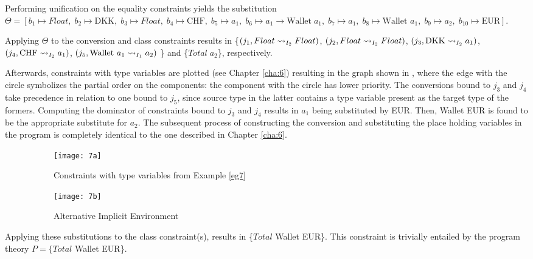Performing unification on the equality constraints yields the substitution $\Theta = [b_1 \mapsto Float, \;b_2 \mapsto \text{DKK}, \;b_3 \mapsto Float, \;b_4 \mapsto \text{CHF}, \;b_5 \mapsto a_1, \;b_6 \mapsto a_1 \to \text{Wallet}\;a_1, \;b_7 \mapsto a_1, \;b_8 \mapsto \text{Wallet }a_1, \;b_9 \mapsto a_2, \;b_{10} \mapsto \text{EUR}]$.

Applying $\Theta$ to the conversion and class constraints results in \{$(j_1,\convX{\imEnv_2}{Float}{Float})$, $(j_2,\convX{\imEnv_2}{Float}{Float})$, $(j_3,\convX{\imEnv_2}{\text{DKK}}{a_1})$, $(j_4,\convX{\imEnv_2}{\text{CHF}}{a_1})$, $(j_5,\convX{\imEnv_1}{\text{Wallet }a_1}{a_2})$ \} and \{$Total\;a_2$\}, respectively.

Afterwards, constraints with type variables are plotted (see Chapter \ref{cha:6}) resulting in the graph shown in , where the edge with the circle symbolizes the partial order on the components: the component with the circle has lower priority. The conversions bound to $j_3$ and $j_4$ take precedence in relation to one bound to $j_5$, since source type in the latter contains a type variable present as the target type of the formers. Computing the dominator of constraints bound to $j_3$ and $j_4$ results in $a_1$ being substituted by EUR. Then, Wallet EUR is found to be the appropriate substitute for $a_2$. The subsequent process of constructing the conversion and substituting the place holding variables in the program is completely identical to the one described in Chapter \ref{cha:6}.

\begin{figure}
  \centering
  \begin{subfigure}[b]{.30\textwidth}
    \centering
    \texttt{[image: 7a]}
    \caption{Constraints with type variables from Example \ref{eg7}}
    \label{7a}
  \end{subfigure}
  \begin{subfigure}[b]{.30\textwidth}
    \centering
    \texttt{[image: 7b]}
    \caption{Alternative Implicit Environment}
    \label{7b}
  \end{subfigure}
  \caption{ }
\end{figure}
  
Applying these substitutions to the class constraint(s), results in \{$Total$ Wallet EUR\}. This constraint is trivially entailed by the program theory $P = \{Total$ Wallet EUR\}.

